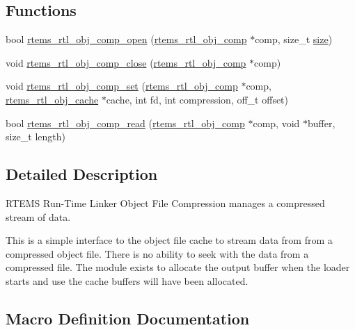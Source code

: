 \subsection*{Functions}
\begin{DoxyCompactItemize}
\item 
bool \mbox{\hyperlink{rtl-obj-comp_8h_ae57c7af4f1fefa9e13f9ed00eb01dcf3}{rtems\+\_\+rtl\+\_\+obj\+\_\+comp\+\_\+open}} (\mbox{\hyperlink{rtl-obj-comp_8h_a5ac76d7cdc14a520157bd5c8a322f56c}{rtems\+\_\+rtl\+\_\+obj\+\_\+comp}} $\ast$comp, size\+\_\+t \mbox{\hyperlink{sun4u_2tte_8h_a245260f6f74972558f61b85227df5aae}{size}})
\item 
void \mbox{\hyperlink{rtl-obj-comp_8h_aa623f3df8f95696261fe1f558bff7873}{rtems\+\_\+rtl\+\_\+obj\+\_\+comp\+\_\+close}} (\mbox{\hyperlink{rtl-obj-comp_8h_a5ac76d7cdc14a520157bd5c8a322f56c}{rtems\+\_\+rtl\+\_\+obj\+\_\+comp}} $\ast$comp)
\item 
void \mbox{\hyperlink{rtl-obj-comp_8h_a53f6650db0abec0a0fae4ad5a5975baa}{rtems\+\_\+rtl\+\_\+obj\+\_\+comp\+\_\+set}} (\mbox{\hyperlink{rtl-obj-comp_8h_a5ac76d7cdc14a520157bd5c8a322f56c}{rtems\+\_\+rtl\+\_\+obj\+\_\+comp}} $\ast$comp, \mbox{\hyperlink{structrtems__rtl__obj__cache}{rtems\+\_\+rtl\+\_\+obj\+\_\+cache}} $\ast$cache, int fd, int compression, off\+\_\+t offset)
\item 
bool \mbox{\hyperlink{rtl-obj-comp_8h_a4ad76f30e119ef7536b1222220715a40}{rtems\+\_\+rtl\+\_\+obj\+\_\+comp\+\_\+read}} (\mbox{\hyperlink{rtl-obj-comp_8h_a5ac76d7cdc14a520157bd5c8a322f56c}{rtems\+\_\+rtl\+\_\+obj\+\_\+comp}} $\ast$comp, void $\ast$buffer, size\+\_\+t length)
\end{DoxyCompactItemize}


\subsection{Detailed Description}
R\+T\+E\+MS Run-\/\+Time Linker Object File Compression manages a compressed stream of data. 

This is a simple interface to the object file cache to stream data from from a compressed object file. There is no ability to seek with the data from a compressed file. The module exists to allocate the output buffer when the loader starts and use the cache buffers will have been allocated. 

\subsection{Macro Definition Documentation}
\mbox{\label{rtl-obj-comp_8h_a295f45fc293c0e2ee6d9d828451d34eb}} 

